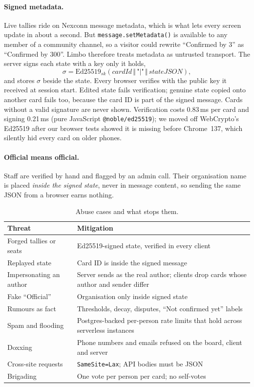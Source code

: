 \documentclass[10pt,twocolumn]{article}
\newcommand{\code}[1]{\texttt{\small #1}}
\begin{document}
\paragraph{Signed metadata.} Live tallies ride on Nexconn message metadata, which is what lets every screen update in
about a second. But \code{message.setMetadata()} is available to any member of a community channel, so a visitor
could rewrite ``Confirmed by 3'' as ``Confirmed by 300''. Limbo therefore treats metadata as untrusted transport. The
server signs each state with a key only it holds,
\begin{equation}
  \sigma = \mathrm{Ed25519}_{sk}\!\left(\textit{cardId} \,\Vert\, \texttt{"|"} \,\Vert\, \textit{stateJSON}\right),
\end{equation}
and stores $\sigma$ beside the state. Every browser verifies with the public key it received at session start.
Edited state fails verification; genuine state copied onto another card fails too, because the card ID is part of
the signed message. Cards without a valid signature are never shown. Verification costs 0.83\,ms per card and signing
0.21\,ms (pure JavaScript \code{@noble/ed25519}); we moved off WebCrypto's Ed25519 after our browser tests showed it is
missing before Chrome~137, which silently hid every card on older phones.

\paragraph{Official means official.} Staff are verified by hand and flagged by an admin call. Their organisation name
is placed \emph{inside the signed state}, never in message content, so sending the same JSON from a browser earns
nothing.

\begin{table}[t]
\centering\small
\caption{Abuse cases and what stops them.}
\label{tab:threats}
\begin{tabularx}{\columnwidth}{@{}>{\raggedright\arraybackslash}p{2.75cm} X@{}}
\toprule
\textbf{Threat} & \textbf{Mitigation} \\
\midrule
Forged tallies or seats & Ed25519-signed state, verified in every client \\
Replayed state & Card ID is inside the signed message \\
Impersonating an author & Server sends as the real author; clients drop cards whose author and sender differ \\
Fake ``Official'' & Organisation only inside signed state \\
Rumours as fact & Thresholds, decay, disputes, ``Not confirmed yet'' labels \\
Spam and flooding & Postgres-backed per-person rate limits that hold across serverless instances \\
Doxxing & Phone numbers and emails refused on the board, client and server \\
Cross-site requests & \code{SameSite=Lax}; API bodies must be JSON \\
Brigading & One vote per person per card; no self-votes \\
\bottomrule
\end{tabularx}
\end{table}
\end{document}
